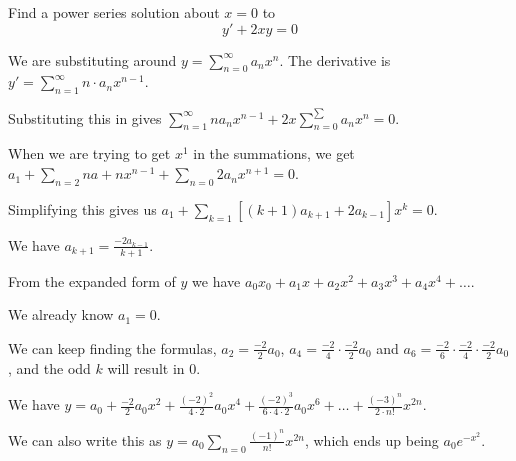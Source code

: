 \documentclass[../diffeq.tex]{subfiles}
\begin{document}
\begin{example}
    Find a power series solution about $x=0$ to 
    \[ y'+2xy=0 \]

    We are substituting around $y=\sum_{n=0}^{\infty}a_nx^n$. The derivative is $y'=\sum_{n=1}^{\infty} n\cdot a_nx^{n-1}$.

    Substituting this in gives $\sum_{n=1}^{\infty} na_nx^{n-1}+2x\sum_{n=0}^{\sum} a_nx^n =0$.

    When we are trying to get $x^1$ in the summations, we get $a_1 + \sum_{n=2}na+nx^{n-1}+\sum_{n=0}2a_nx^{n+1}=0$.

    Simplifying this gives us $a_1+\sum_{k=1}[(k+1)a_{k+1}+2a_{k-1}]x^k=0$.

    We have $a_{k+1}=\frac{-2a_{k-1}}{k+1}$.

    From the expanded form of $y$ we have $a_0x_0+a_1x+a_2x^2+a_3x^3+a_4x^4+\dots$. 

    We already know $a_1=0$.

    We can keep finding the formulas, $a_2=\frac{-2}{2}a_0$, $a_4=\frac{-2}{4}\cdot \frac{-2}{2}a_0$ and $a_6=\frac{-2}{6}\cdot \frac{-2}{4}\cdot \frac{-2}{2}a_0$, and the odd $k$ will result in $0$.

    We have $y=a_0+\frac{-2}{2}a_0x^2+\frac{(-2)^2}{4\cdot 2}a_0x^4+\frac{(-2)^3}{6\cdot 4\cdot 2}a_0x^6+\dots + \frac{(-3)^n}{2\cdot n!}x^{2n}$.

    We can also write this as $y=a_0\sum_{n=0}\frac{(-1)^n}{n!}x^{2n}$, which ends up being $a_0e^{-x^2}$.
\end{example}
\end{document}
